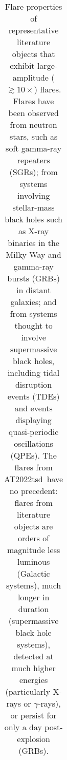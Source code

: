 \documentclass{nature_plusfigure}
\newcommand{\at}{AT2022tsd}
\begin{document}
\begin{table}
\begin{tabular}{lllll}
    \hline\hline
    \end{tabular}
    \caption{Flare properties of representative literature objects that exhibit large-amplitude ($\gtrsim10\times$) flares. Flares have been observed from neutron stars, such as soft gamma-ray repeaters (SGRs); from systems involving stellar-mass black holes such as X-ray binaries in the Milky Way and gamma-ray bursts (GRBs) in distant galaxies; and from systems thought to involve supermassive black holes, including tidal disruption events (TDEs) and events displaying quasi-periodic oscillations (QPEs). The flares from \at\ have no precedent: flares from literature objects are orders of magnitude less luminous (Galactic systems), much longer in duration (supermassive black hole systems), detected at much higher energies (particularly X-rays or $\gamma$-rays), or persist for only a day post-explosion (GRBs).}
    \label{tab:flaring-classes}
\end{table}

\clearpage


%
%
\end{document}
